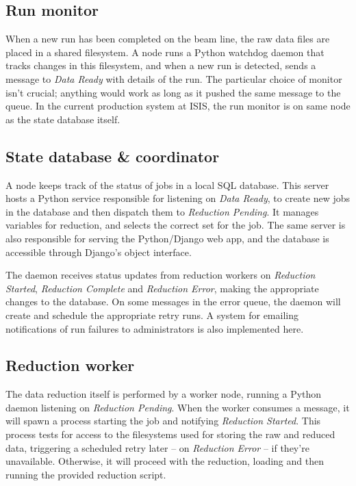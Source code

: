 \documentclass[twocolumn]{article}
\begin{document}
\subsection{Run monitor}\label{run-monitor}

When a new run has been completed on the beam line, the raw data files are
placed in a shared filesystem. A node runs a Python watchdog daemon that
tracks changes in this filesystem, and when a new run is detected, sends a
message to \emph{Data Ready} with details of the run. The particular
choice of monitor isn't crucial; anything would work as long as it
pushed the same message to the queue. In the current production system
at ISIS, the run monitor is on same node as the state database itself.

\subsection{State database \& coordinator}\label{state-database}

A node keeps track of the status of jobs in a local SQL database. This
server hosts a Python service responsible for listening on \emph{Data
Ready}, to create new jobs in the database and then dispatch them to \emph{Reduction
Pending}. It manages variables for reduction, and selects the correct
set for the job. The same server is also responsible for serving the
Python/Django\cite{django} web app, and the database is accessible through
Django's object interface.

The daemon receives status updates from reduction workers on
\emph{Reduction Started}, \emph{Reduction Complete} and \emph{Reduction
Error}, making the appropriate changes to the database. On some messages
in the error queue, the daemon will create and schedule the appropriate
retry runs. A system for emailing notifications of run failures to
administrators is also implemented here.

\subsection{Reduction worker}\label{reduction-worker}

The data reduction itself is performed by a worker node, running a
Python daemon listening on \emph{Reduction Pending}. When the worker
consumes a message, it will spawn a process starting the job and
notifying \emph{Reduction Started}. This process tests for access to the
filesystems used for storing the raw and reduced data, triggering a
scheduled retry later -- on \emph{Reduction Error} -- if they're
unavailable. Otherwise, it will proceed with the reduction, loading and
then running the provided reduction script.
\end{document}

